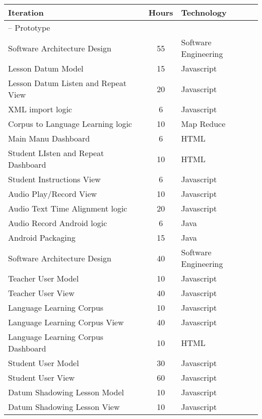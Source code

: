 \documentclass[12pt]{article} %
\begin{document}
\begin{table}[htbp]
\begin{center}
  \begin{tabular}{ | lcl | }
\hline
Iteration &	 Hours &	Technology	\\
\hline
-- Prototype && \\ 
Software Architecture Design & 55 & Software Engineering \\
Lesson Datum Model & 15  & Javascript \\
Lesson Datum Listen and Repeat View & 20  & Javascript \\
XML import logic  & 6 & Javascript \\ 
Corpus to Language Learning logic  &  10  & Map Reduce \\ 
Main Manu Dashboard  & 6  & HTML \\ 
Student LIsten and Repeat Dashboard  & 10  & HTML \\ 
Student Instructions View  & 6  & Javascript \\ 
Audio Play/Record View  & 10  & Javascript \\ 
Audio Text Time Alignment logic  & 20  & Javascript \\ 
Audio Record Android logic  &  6  & Java \\ 
Android Packaging  & 15  & Java \\ 
\hline 
Software Architecture Design & 40 & Software Engineering  \\ 
Teacher User Model  &  10 &  Javascript \\ 
Teacher User View  &  40  & Javascript \\ 
Language Learning Corpus  &  10 &  Javascript \\ 
Language Learning Corpus View  &  40  & Javascript \\ 
Language Learning Corpus Dashboard  &  10  & HTML \\ 
Student User Model  &  30  & Javascript \\ 
Student User View  &  60  & Javascript \\ 
Datum Shadowing Lesson Model  & 10 & Javascript \\ 
Datum Shadowing Lesson View  &  10  &  Javascript \\ 

\end{tabular}
\end{center}
\end{table}
\end{document}
